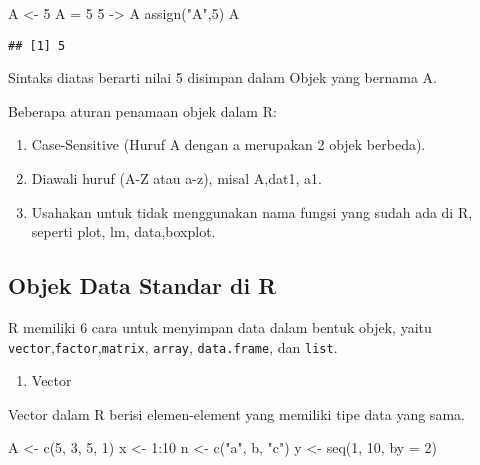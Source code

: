 \documentclass[
]{book}
\newenvironment{Shaded}{\begin{snugshade}}{\end{snugshade}}
\newcommand{\AttributeTok}[1]{\textcolor[rgb]{0.77,0.63,0.00}{#1}}
\newcommand{\DecValTok}[1]{\textcolor[rgb]{0.00,0.00,0.81}{#1}}
\newcommand{\FunctionTok}[1]{\textcolor[rgb]{0.00,0.00,0.00}{#1}}
\newcommand{\NormalTok}[1]{#1}
\newcommand{\OtherTok}[1]{\textcolor[rgb]{0.56,0.35,0.01}{#1}}
\newcommand{\SpecialCharTok}[1]{\textcolor[rgb]{0.00,0.00,0.00}{#1}}
\newcommand{\StringTok}[1]{\textcolor[rgb]{0.31,0.60,0.02}{#1}}
\providecommand{\tightlist}{%
  \setlength{\itemsep}{0pt}\setlength{\parskip}{0pt}}
\begin{document}
\begin{Shaded}
\begin{Highlighting}[]
\NormalTok{A }\OtherTok{\textless{}{-}} \DecValTok{5}
\NormalTok{A }\OtherTok{=} \DecValTok{5}
\DecValTok{5} \OtherTok{{-}\textgreater{}}\NormalTok{ A}
\FunctionTok{assign}\NormalTok{(}\StringTok{"A"}\NormalTok{,}\DecValTok{5}\NormalTok{)}
\NormalTok{A}
\end{Highlighting}
\end{Shaded}

\begin{verbatim}
## [1] 5
\end{verbatim}

Sintaks diatas berarti nilai 5 disimpan dalam Objek yang bernama A.

Beberapa aturan penamaan objek dalam R:

\begin{enumerate}
\def\labelenumi{\alph{enumi}.}
\tightlist
\item
  Case-Sensitive (Huruf A dengan a merupakan 2 objek berbeda).
\item
  Diawali huruf (A-Z atau a-z), misal A,dat1, a1.
\item
  Usahakan untuk tidak menggunakan nama fungsi yang sudah ada di R, seperti plot, lm, data,boxplot.
\end{enumerate}

\hypertarget{objek-data-standar-di-r}{%
\subsection{Objek Data Standar di R}\label{objek-data-standar-di-r}}

R memiliki 6 cara untuk menyimpan data dalam bentuk objek, yaitu \texttt{vector},\texttt{factor},\texttt{matrix}, \texttt{array}, \texttt{data.frame}, dan \texttt{list}.

\begin{enumerate}
\def\labelenumi{\arabic{enumi}.}
\tightlist
\item
  Vector
\end{enumerate}

Vector dalam R berisi elemen-element yang memiliki tipe data yang sama.

\begin{Shaded}
\begin{Highlighting}[]
\NormalTok{A }\OtherTok{\textless{}{-}} \FunctionTok{c}\NormalTok{(}\DecValTok{5}\NormalTok{, }\DecValTok{3}\NormalTok{, }\DecValTok{5}\NormalTok{, }\DecValTok{1}\NormalTok{)}
\NormalTok{x }\OtherTok{\textless{}{-}} \DecValTok{1}\SpecialCharTok{:}\DecValTok{10}
\NormalTok{n }\OtherTok{\textless{}{-}} \FunctionTok{c}\NormalTok{(}\StringTok{"a"}\NormalTok{, }\StringTok{\textquotesingle{}b\textquotesingle{}}\NormalTok{, }\StringTok{"c"}\NormalTok{)}
\NormalTok{y }\OtherTok{\textless{}{-}} \FunctionTok{seq}\NormalTok{(}\DecValTok{1}\NormalTok{, }\DecValTok{10}\NormalTok{, }\AttributeTok{by =} \DecValTok{2}\NormalTok{)}
\end{Highlighting}
\end{Shaded}
\end{document}
